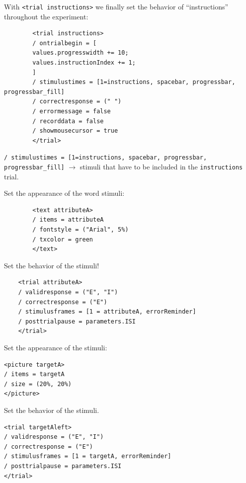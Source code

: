 \documentclass{beamer}
\begin{document}
\begin{frame}[fragile]
	\begin{small}
		With \texttt{<trial instructions>} we finally set the behavior of  ``instructions'' throughout the experiment: 
	
	\begin{verbatim}
		<trial instructions>
		/ ontrialbegin = [
		values.progresswidth += 10;
		values.instructionIndex += 1;
		]
		/ stimulustimes = [1=instructions, spacebar, progressbar, progressbar_fill]
		/ correctresponse = (" ")
		/ errormessage = false
		/ recorddata = false
		/ showmousecursor = true
		</trial>
	\end{verbatim}
	
	\texttt{/ stimulustimes = [1=instructions, spacebar, progressbar, progressbar\_fill]} $\rightarrow$ stimuli that have to be included in the \texttt{instructions} trial.
	\end{small}


\end{frame}

\begin{frame}[fragile]
	Set the appearance of the word stimuli: 
	\vspace{3mm}
	\begin{verbatim}
		<text attributeA>
		/ items = attributeA
		/ fontstyle = ("Arial", 5%)
		/ txcolor = green
		</text>
	\end{verbatim}
\vspace{3mm}

Set the behavior of the stimuli!
\begin{verbatim}
	<trial attributeA>
	/ validresponse = ("E", "I")
	/ correctresponse = ("E")
	/ stimulusframes = [1 = attributeA, errorReminder]
	/ posttrialpause = parameters.ISI
	</trial>
\end{verbatim}

\end{frame}

\begin{frame}[fragile]
	Set the appearance of the stimuli: 
	\vspace{3mm}
	\begin{verbatim}
<picture targetA>
/ items = targetA
/ size = (20%, 20%)
</picture>
	\end{verbatim}
	\vspace{3mm}
	
	Set the behavior of the stimuli.
	\begin{verbatim}
<trial targetAleft>
/ validresponse = ("E", "I")
/ correctresponse = ("E")
/ stimulusframes = [1 = targetA, errorReminder]
/ posttrialpause = parameters.ISI
</trial>
	\end{verbatim}
	
\end{frame}
\end{document}
